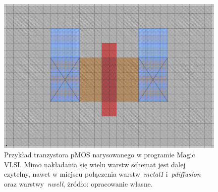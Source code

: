 \begin{figure}[h]
    \centering
    \includegraphics[width=.9\textwidth]{chapters/chapter2/img/magic_tran}
    \caption[Przykład tranzystora pMOS narysowanego w programie Magic VLSI\@.]
    {
        Przykład tranzystora pMOS narysowanego w programie Magic VLSI\@.
        Mimo nakładania się wielu warstw schemat jest dalej czytelny,
        nawet w miejscu połączenia warstw~\textit{metal1} i~\textit{pdiffusion} oraz warstwy~\textit{nwell},
        żródło: opracowanie własne.
    }
    \label{fig:magic_tran}
\end{figure}
